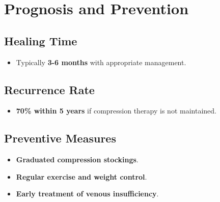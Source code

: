\documentclass{article}
\begin{document}
\section{Prognosis and Prevention}
\subsection{Healing Time}
\begin{itemize}
    \item Typically \textbf{3-6 months} with appropriate management.
\end{itemize}

\subsection{Recurrence Rate}
\begin{itemize}
    \item \textbf{70\% within 5 years} if compression therapy is not maintained.
\end{itemize}

\subsection{Preventive Measures}
\begin{itemize}
    \item \textbf{Graduated compression stockings}.
    \item \textbf{Regular exercise and weight control}.
    \item \textbf{Early treatment of venous insufficiency}.
\end{itemize}
\end{document}
